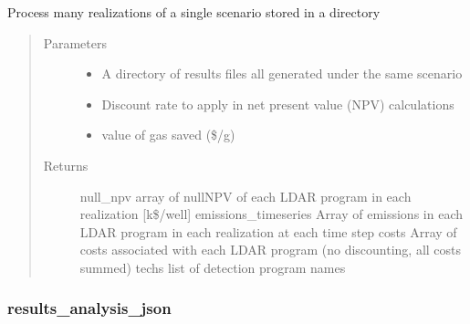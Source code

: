 \documentclass[letterpaper,10pt,english]{sphinxmanual}
\begin{document}
\begin{fulllineitems}
\label{\detokenize{index:feast.ResultsProcessing.results_analysis_functions.results_analysis}}
Process many realizations of a single scenario stored in a directory
\begin{quote}\begin{description}
\item[{Parameters}] \leavevmode\begin{itemize}
\item {} 
 \textendash{} A directory of results files all generated under the same scenario

\item {} 
 \textendash{} Discount rate to apply in net present value (NPV) calculations

\item {} 
 \textendash{} value of gas saved (\$/g)

\end{itemize}

\item[{Returns}] \leavevmode
null\_npv          array of null\sphinxhyphen{}NPV of each LDAR program in each realization {[}k\$/well{]}
emissions\_timeseries  Array of emissions in each LDAR program in each realization at each time step
costs                 Array of costs associated with each LDAR program (no discounting, all costs summed)
techs           list of detection program names

\end{description}\end{quote}

\end{fulllineitems}



\subsubsection{results\_analysis\_json}
\label{\detokenize{index:results-analysis-json}}
\end{document}
